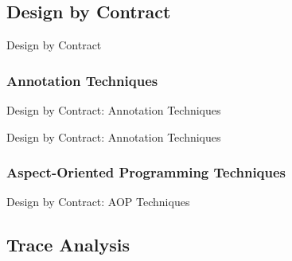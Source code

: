 \documentclass[12pt]{beamer}
\begin{document}

\subsection{Design by Contract}
\label{sec:runver-dbc}

\begin{frame}{Design by Contract}

\end{frame}

\subsubsection{Annotation Techniques}
\label{sec:runver-dbc-ann}

\begin{frame}{Design by Contract: Annotation Techniques}

\end{frame}

\begin{frame}{Design by Contract: Annotation Techniques}
\end{frame}

\subsubsection{Aspect-Oriented Programming Techniques}
\label{sec:runver-sbc-aop}

\begin{frame}{Design by Contract: AOP Techniques}

\end{frame}


\subsection{Trace Analysis}
\label{sec:runver-trace}
\end{document}
